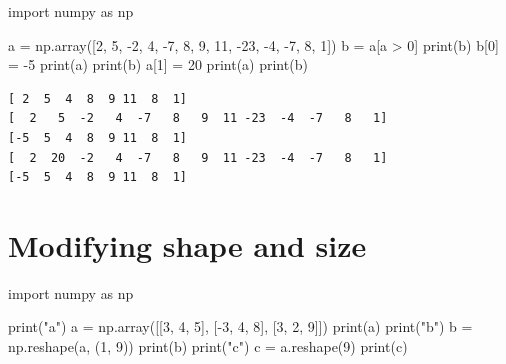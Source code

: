 \documentclass[
  english,
  letterpaper,
  DIV=11,
  numbers=noendperiod]{scrreprt}
\newenvironment{Shaded}{\begin{snugshade}}{\end{snugshade}}
\newcommand{\BuiltInTok}[1]{\textcolor[rgb]{0.00,0.23,0.31}{#1}}
\newcommand{\DecValTok}[1]{\textcolor[rgb]{0.68,0.00,0.00}{#1}}
\newcommand{\ImportTok}[1]{\textcolor[rgb]{0.00,0.46,0.62}{#1}}
\newcommand{\NormalTok}[1]{\textcolor[rgb]{0.00,0.23,0.31}{#1}}
\newcommand{\OperatorTok}[1]{\textcolor[rgb]{0.37,0.37,0.37}{#1}}
\newcommand{\StringTok}[1]{\textcolor[rgb]{0.13,0.47,0.30}{#1}}
\begin{document}
\begin{Shaded}
\begin{Highlighting}[]
\ImportTok{import}\NormalTok{ numpy }\ImportTok{as}\NormalTok{ np}

\NormalTok{a }\OperatorTok{=}\NormalTok{ np.array([}\DecValTok{2}\NormalTok{, }\DecValTok{5}\NormalTok{, }\OperatorTok{{-}}\DecValTok{2}\NormalTok{, }\DecValTok{4}\NormalTok{, }\OperatorTok{{-}}\DecValTok{7}\NormalTok{, }\DecValTok{8}\NormalTok{, }\DecValTok{9}\NormalTok{, }\DecValTok{11}\NormalTok{, }\OperatorTok{{-}}\DecValTok{23}\NormalTok{, }\OperatorTok{{-}}\DecValTok{4}\NormalTok{, }\OperatorTok{{-}}\DecValTok{7}\NormalTok{, }\DecValTok{8}\NormalTok{, }\DecValTok{1}\NormalTok{])}
\NormalTok{b }\OperatorTok{=}\NormalTok{ a[a }\OperatorTok{\textgreater{}} \DecValTok{0}\NormalTok{]}
\BuiltInTok{print}\NormalTok{(b)}
\NormalTok{b[}\DecValTok{0}\NormalTok{] }\OperatorTok{=} \OperatorTok{{-}}\DecValTok{5}
\BuiltInTok{print}\NormalTok{(a)}
\BuiltInTok{print}\NormalTok{(b)}
\NormalTok{a[}\DecValTok{1}\NormalTok{] }\OperatorTok{=} \DecValTok{20}
\BuiltInTok{print}\NormalTok{(a)}
\BuiltInTok{print}\NormalTok{(b)}
\end{Highlighting}
\end{Shaded}

\begin{verbatim}
[ 2  5  4  8  9 11  8  1]
[  2   5  -2   4  -7   8   9  11 -23  -4  -7   8   1]
[-5  5  4  8  9 11  8  1]
[  2  20  -2   4  -7   8   9  11 -23  -4  -7   8   1]
[-5  5  4  8  9 11  8  1]
\end{verbatim}

\chapter{Modifying shape and size}\label{modifying-shape-and-size}

\begin{Shaded}
\begin{Highlighting}[]
\ImportTok{import}\NormalTok{ numpy }\ImportTok{as}\NormalTok{ np}

\BuiltInTok{print}\NormalTok{(}\StringTok{"a"}\NormalTok{)}
\NormalTok{a }\OperatorTok{=}\NormalTok{ np.array([[}\DecValTok{3}\NormalTok{, }\DecValTok{4}\NormalTok{, }\DecValTok{5}\NormalTok{], [}\OperatorTok{{-}}\DecValTok{3}\NormalTok{, }\DecValTok{4}\NormalTok{, }\DecValTok{8}\NormalTok{], [}\DecValTok{3}\NormalTok{, }\DecValTok{2}\NormalTok{, }\DecValTok{9}\NormalTok{]])}
\BuiltInTok{print}\NormalTok{(a)}
\BuiltInTok{print}\NormalTok{(}\StringTok{"b"}\NormalTok{)}
\NormalTok{b }\OperatorTok{=}\NormalTok{ np.reshape(a, (}\DecValTok{1}\NormalTok{, }\DecValTok{9}\NormalTok{))}
\BuiltInTok{print}\NormalTok{(b)}
\BuiltInTok{print}\NormalTok{(}\StringTok{"c"}\NormalTok{)}
\NormalTok{c }\OperatorTok{=}\NormalTok{ a.reshape(}\DecValTok{9}\NormalTok{)}
\BuiltInTok{print}\NormalTok{(c)}
\end{Highlighting}
\end{Shaded}
\end{document}
